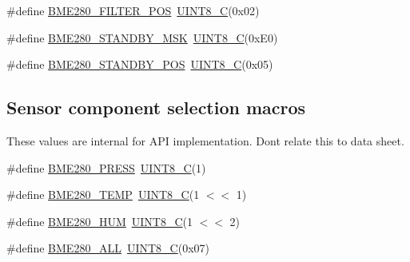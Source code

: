 \begin{DoxyCompactItemize}
\item 
\#define \hyperlink{group___b_m_e280_gaa1b84aa73f4208ec8bc348f0befd6218}{B\+M\+E280\+\_\+\+F\+I\+L\+T\+E\+R\+\_\+\+P\+OS}~\hyperlink{group___b_m_e280_gacd2aa09844a8a245cf7fdbb808e215e5}{U\+I\+N\+T8\+\_\+C}(0x02)
\item 
\#define \hyperlink{group___b_m_e280_gad605c1d49d0c13cc7fd78148894c8be3}{B\+M\+E280\+\_\+\+S\+T\+A\+N\+D\+B\+Y\+\_\+\+M\+SK}~\hyperlink{group___b_m_e280_gacd2aa09844a8a245cf7fdbb808e215e5}{U\+I\+N\+T8\+\_\+C}(0x\+E0)
\item 
\#define \hyperlink{group___b_m_e280_ga95d6cbf0004b76308440a9b72d157508}{B\+M\+E280\+\_\+\+S\+T\+A\+N\+D\+B\+Y\+\_\+\+P\+OS}~\hyperlink{group___b_m_e280_gacd2aa09844a8a245cf7fdbb808e215e5}{U\+I\+N\+T8\+\_\+C}(0x05)
\end{DoxyCompactItemize}
\subsection*{Sensor component selection macros}
\label{_amgrpe7f46ee36b0f2055f4f6dcecbcfeefdf}%
These values are internal for A\+PI implementation. Don\textquotesingle{}t relate this to data sheet. \begin{DoxyCompactItemize}
\item 
\#define \hyperlink{group___b_m_e280_gadfbc93f23e81f44aeb31d6e1c3e29f59}{B\+M\+E280\+\_\+\+P\+R\+E\+SS}~\hyperlink{group___b_m_e280_gacd2aa09844a8a245cf7fdbb808e215e5}{U\+I\+N\+T8\+\_\+C}(1)
\item 
\#define \hyperlink{group___b_m_e280_gaa3ffc130a1db4dd1cdb4b11936a2becc}{B\+M\+E280\+\_\+\+T\+E\+MP}~\hyperlink{group___b_m_e280_gacd2aa09844a8a245cf7fdbb808e215e5}{U\+I\+N\+T8\+\_\+C}(1 $<$$<$ 1)
\item 
\#define \hyperlink{group___b_m_e280_ga709c35c30ebfe237189e533dedbca264}{B\+M\+E280\+\_\+\+H\+UM}~\hyperlink{group___b_m_e280_gacd2aa09844a8a245cf7fdbb808e215e5}{U\+I\+N\+T8\+\_\+C}(1 $<$$<$ 2)
\item 
\#define \hyperlink{group___b_m_e280_ga8b1cf23a873282113bb8218e615855e3}{B\+M\+E280\+\_\+\+A\+LL}~\hyperlink{group___b_m_e280_gacd2aa09844a8a245cf7fdbb808e215e5}{U\+I\+N\+T8\+\_\+C}(0x07)
\end{DoxyCompactItemize}
